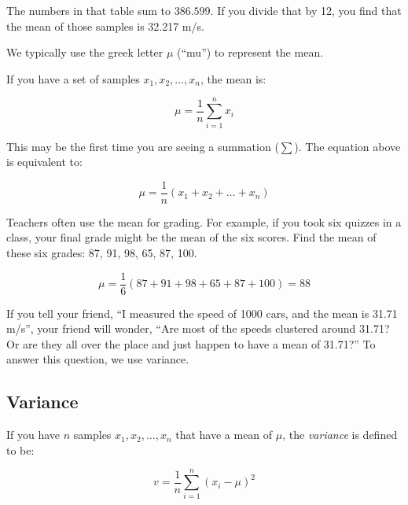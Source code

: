 The numbers in that table sum to $386.599$.  If you divide that by 12,
you find that the mean of those samples is 32.217 m/s.

We typically use the greek letter $\mu$ (``mu'') to represent the mean.

\begin{mdframed}[style=important, frametitle={Definition of Mean}]
  
If you have a set of samples $x_1, x_2, \ldots, x_n$, the mean is:

$$ \mu = \frac{1}{n} \sum_{i=1}^n x_i$$

\end{mdframed}

This may be the first time you are seeing a summation ($\sum$). The equation above is equivalent to:

$$ \mu = \frac{1}{n} \left(x_1 + x_2 + \ldots + x_n\right)$$

\begin{Exercise}[title={Mean Grade}, label=grades_mean]

  Teachers often use the mean for grading. For example, if you took
  six quizzes in a class, your final grade might be the mean of the six
  scores. Find the mean of these six grades: 87, 91, 98, 65, 87, 100.

\end{Exercise}
\begin{Answer}[ref=grades_mean]

  $$\mu =\frac{1}{6} \left(87 + 91 + 98 + 65 + 87 + 100 \right) = 88$$

\end{Answer}

If you tell your friend, ``I measured the speed of 1000 cars, and the
mean is 31.71 m/s'', your friend will wonder, ``Are most of the speeds
clustered around 31.71? Or are they all over the place and just happen
to have a mean of 31.71?'' To answer this question, we use variance.

\subsection{Variance}

\begin{mdframed}[style=important, frametitle={Definition of Variance}]

If you have $n$ samples $x_1, x_2, \ldots, x_n$ that have a mean of $\mu$, the \textit{variance} is defined to be:

$$v = \frac{1}{n}\sum_{i = 1}^{n} \left(x_i - \mu\right)^2$$
\end{mdframed}

